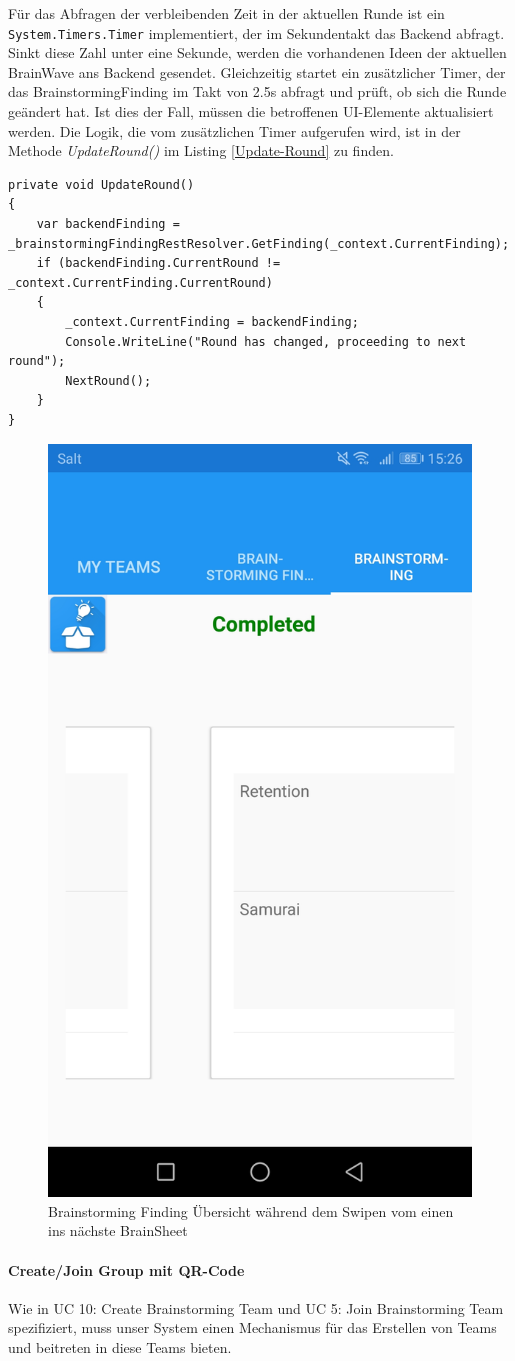 Für das Abfragen der verbleibenden Zeit in der aktuellen Runde ist ein \texttt{System.{\-}Timers.Timer} implementiert, der im Sekundentakt das Backend abfragt. Sinkt diese Zahl unter eine Sekunde, werden die vorhandenen Ideen der aktuellen BrainWave ans Backend gesendet. Gleichzeitig startet ein zusätzlicher Timer, der das BrainstormingFinding im Takt von 2.5s abfragt und prüft, ob sich die Runde geändert hat. Ist dies der Fall, müssen die betroffenen UI-Elemente aktualisiert werden. Die Logik, die vom zusätzlichen Timer aufgerufen wird, ist in der Methode \textit{UpdateRound()} im Listing \ref{Update-Round} zu finden.


\begin{lstlisting}[label=Update-Round,caption=Poll-Mechanismus um zu prüfen ob Runde gewechselt hat]
private void UpdateRound()
{
	var backendFinding = _brainstormingFindingRestResolver.GetFinding(_context.CurrentFinding);
	if (backendFinding.CurrentRound != _context.CurrentFinding.CurrentRound)
	{
		_context.CurrentFinding = backendFinding;
		Console.WriteLine("Round has changed, proceeding to next round");
		NextRound();
	}
}
\end{lstlisting}

\begin{figure}
	\centering
	\includegraphics[width=0.4\linewidth,height=0.4\textheight,keepaspectratio]{img/techn-bericht/brainstorming-overview}
	\caption{Brainstorming Finding Übersicht während dem Swipen vom einen ins nächste BrainSheet}
	\label{fig:brainstorming-overview}
\end{figure}

\paragraph*{Create/Join Group mit QR-Code}
Wie in UC 10: Create Brainstorming Team und UC 5: Join Brainstorming Team spezifiziert, muss unser System einen Mechanismus für das Erstellen von Teams und beitreten in diese Teams bieten. 


